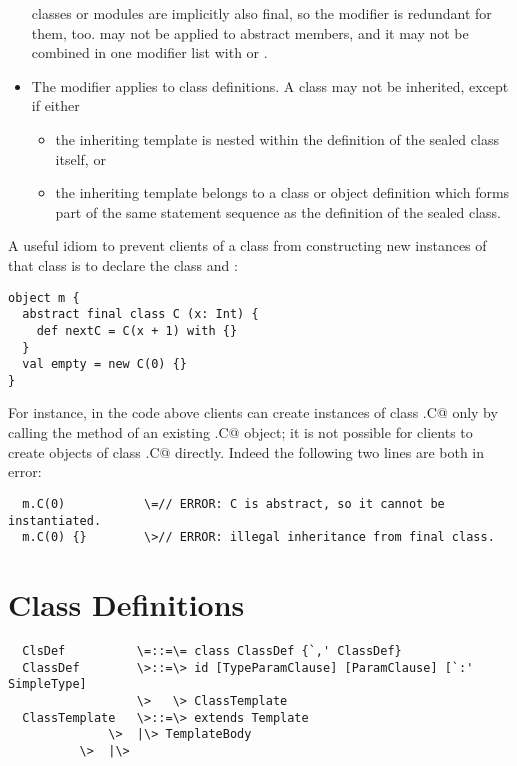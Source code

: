 \documentclass[11pt]{report}
\begin{document}
\begin{itemize}
classes or modules are implicitly also final, so the \verb@final@
modifier is redundant for them, too.  \verb@final@ may not be applied
to abstract members, and it may not be combined in one modifier list with
\verb@private@ or \verb@sealed@.
\item
The \verb@sealed@ modifier applies to class definitions. A
\verb@sealed@ class may not be inherited, except if either
\begin{itemize}
\item
the inheriting template is nested within the definition of the sealed
class itself, or
\item
the inheriting template belongs to a class or object definition which
forms part of the same statement sequence as the definition of the
sealed class.
\end{itemize}
\end{itemize}

\example A useful idiom to prevent clients of a class from
constructing new instances of that class is to declare the class
\verb@final@ and \verb@abstract@:

\begin{verbatim}
object m {
  abstract final class C (x: Int) {
    def nextC = C(x + 1) with {}
  }
  val empty = new C(0) {}
}
\end{verbatim}
For instance, in the code above clients can create instances of class
\verb@m.C@ only by calling the \verb@nextC@ method of an existing \verb@m.C@
object; it is not possible for clients to create objects of class
\verb@m.C@ directly. Indeed the following two lines are both in error:

\begin{verbatim}
  m.C(0)           \=// ERROR: C is abstract, so it cannot be instantiated.
  m.C(0) {}        \>// ERROR: illegal inheritance from final class.
\end{verbatim}

\section{Class Definitions}
\label{sec:classes}

\syntax\begin{verbatim}
  ClsDef          \=::=\= class ClassDef {`,' ClassDef}
  ClassDef        \>::=\> id [TypeParamClause] [ParamClause] [`:' SimpleType] 
                  \>   \> ClassTemplate
  ClassTemplate   \>::=\> extends Template
	          \>  |\> TemplateBody
		  \>  |\>
\end{verbatim}
\end{document}
